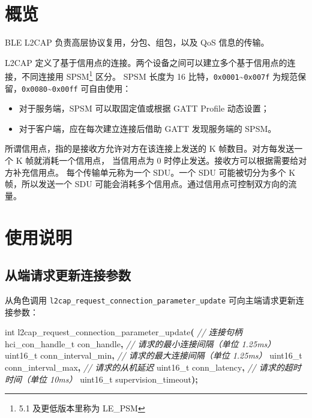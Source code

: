 \documentclass[
  12pt,
]{book}
\newenvironment{Shaded}{\begin{snugshade}}{\end{snugshade}}
\newcommand{\CommentTok}[1]{\textcolor[rgb]{0.56,0.35,0.01}{\textit{#1}}}
\newcommand{\DataTypeTok}[1]{\textcolor[rgb]{0.13,0.29,0.53}{#1}}
\newcommand{\NormalTok}[1]{#1}
\newcommand{\OperatorTok}[1]{\textcolor[rgb]{0.81,0.36,0.00}{\textbf{#1}}}
\providecommand{\tightlist}{%
  \setlength{\itemsep}{0pt}\setlength{\parskip}{0pt}}
\begin{document}
\hypertarget{ux6982ux89c8-5}{%
\section{概览}\label{ux6982ux89c8-5}}

BLE L2CAP 负责高层协议复用，分包、组包，以及 QoS 信息的传输。

L2CAP 定义了基于信用点的连接。两个设备之间可以建立多个基于信用点的连接，不同连接用 SPSM\footnote{5.1 及更低版本里称为 LE\_PSM} 区分。
SPSM 长度为 16 比特，\texttt{0x0001}\textasciitilde{}\texttt{0x007f} 为规范保留，\texttt{0x0080}\textasciitilde{}\texttt{0x00ff} 可自由使用：

\begin{itemize}
\tightlist
\item
  对于服务端，SPSM 可以取固定值或根据 GATT Profile 动态设置；
\item
  对于客户端，应在每次建立连接后借助 GATT 发现服务端的 SPSM。
\end{itemize}

所谓信用点，指的是接收方允许对方在该连接上发送的 K 帧数目。对方每发送一个 K 帧就消耗一个信用点，
当信用点为 \(0\) 时停止发送。接收方可以根据需要给对方补充信用点。
每个传输单元称为一个 SDU。一个 SDU 可能被切分为多个 K 帧，所以发送一个 SDU
可能会消耗多个信用点。通过信用点可控制双方向的流量。

\hypertarget{ux4f7fux7528ux8bf4ux660e-5}{%
\section{使用说明}\label{ux4f7fux7528ux8bf4ux660e-5}}

\hypertarget{ux4eceux7aefux8bf7ux6c42ux66f4ux65b0ux8fdeux63a5ux53c2ux6570}{%
\subsection{从端请求更新连接参数}\label{ux4eceux7aefux8bf7ux6c42ux66f4ux65b0ux8fdeux63a5ux53c2ux6570}}

从角色调用 \texttt{l2cap\_request\_connection\_parameter\_update} 可向主端请求更新连接参数：

\begin{Shaded}
\begin{Highlighting}[]
\DataTypeTok{int}\NormalTok{ l2cap\_request\_connection\_parameter\_update}\OperatorTok{(}
  \CommentTok{// 连接句柄}
\NormalTok{  hci\_con\_handle\_t con\_handle}\OperatorTok{,}
  \CommentTok{// 请求的最小连接间隔（单位 1.25ms）}
  \DataTypeTok{uint16\_t}\NormalTok{ conn\_interval\_min}\OperatorTok{,}
  \CommentTok{// 请求的最大连接间隔（单位 1.25ms）}
  \DataTypeTok{uint16\_t}\NormalTok{ conn\_interval\_max}\OperatorTok{,}
  \CommentTok{// 请求的从机延迟}
  \DataTypeTok{uint16\_t}\NormalTok{ conn\_latency}\OperatorTok{,}
  \CommentTok{// 请求的超时时间（单位 10ms）}
  \DataTypeTok{uint16\_t}\NormalTok{ supervision\_timeout}\OperatorTok{);}
\end{Highlighting}
\end{Shaded}
\end{document}
